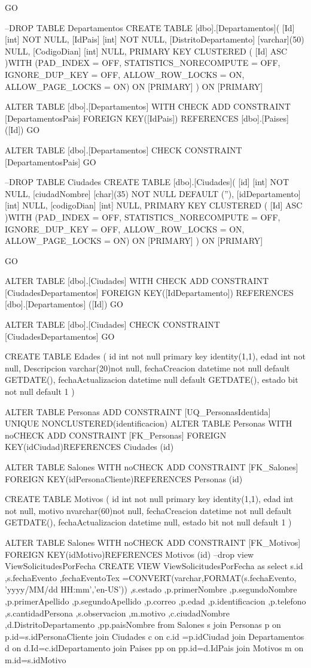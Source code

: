 GO

--DROP TABLE Departamentos
CREATE TABLE [dbo].[Departamentos](
	[Id] [int] NOT NULL,
	[IdPais] [int] NOT NULL,
	[DistritoDepartamento] [varchar](50) NULL,
	[CodigoDian] [int] NULL,
PRIMARY KEY CLUSTERED 
(
	[Id] ASC
)WITH (PAD_INDEX = OFF, STATISTICS_NORECOMPUTE = OFF, IGNORE_DUP_KEY = OFF, ALLOW_ROW_LOCKS = ON, ALLOW_PAGE_LOCKS = ON) ON [PRIMARY]
) ON [PRIMARY]


ALTER TABLE [dbo].[Departamentos]  WITH CHECK ADD  CONSTRAINT [DepartamentosPais] FOREIGN KEY([IdPais])
REFERENCES [dbo].[Paises] ([Id])
GO

ALTER TABLE [dbo].[Departamentos] CHECK CONSTRAINT [DepartamentosPais]
GO

--DROP TABLE Ciudades
CREATE TABLE [dbo].[Ciudades](
	[id] [int] NOT NULL,
	[ciudadNombre] [char](35) NOT NULL DEFAULT (''),
	[idDepartamento] [int] NULL,
	[codigoDian] [int] NULL,
PRIMARY KEY CLUSTERED 
(
	[Id] ASC
)WITH (PAD_INDEX = OFF, STATISTICS_NORECOMPUTE = OFF, IGNORE_DUP_KEY = OFF, ALLOW_ROW_LOCKS = ON, ALLOW_PAGE_LOCKS = ON) ON [PRIMARY]
) ON [PRIMARY]

GO

ALTER TABLE [dbo].[Ciudades]  WITH CHECK ADD  CONSTRAINT [CiudadesDepartamentos] FOREIGN KEY([IdDepartamento])
REFERENCES [dbo].[Departamentos] ([Id])
GO

ALTER TABLE [dbo].[Ciudades] CHECK CONSTRAINT [CiudadesDepartamentos]
GO

CREATE TABLE Edades
(
	id int not null primary key identity(1,1),
	edad int not null,
	Descripcion varchar(20)not null,
    fechaCreacion datetime not null default GETDATE(),
	fechaActualizacion datetime null default GETDATE(),
    estado bit not null default 1
)

ALTER TABLE Personas ADD  CONSTRAINT [UQ_PersonasIdentida] UNIQUE NONCLUSTERED(identificacion)
ALTER TABLE Personas  WITH noCHECK ADD  CONSTRAINT [FK_Personas] FOREIGN KEY(idCiudad)REFERENCES Ciudades (id)

ALTER TABLE Salones  WITH noCHECK ADD  CONSTRAINT [FK_Salones] FOREIGN KEY(idPersonaCliente)REFERENCES Personas (id)


CREATE TABLE Motivos
(
	id int not null primary key identity(1,1),
	edad int not null,
	motivo nvarchar(60)not null,
    fechaCreacion datetime not null default GETDATE(),
	fechaActualizacion datetime null,
    estado bit not null default 1
)


ALTER TABLE Salones  WITH noCHECK ADD  CONSTRAINT [FK_Motivos] FOREIGN KEY(idMotivo)REFERENCES Motivos (id)
--drop view ViewSolicitudesPorFecha
CREATE VIEW  ViewSolicitudesPorFecha as
select s.id
,s.fechaEvento
,fechaEventoTex =CONVERT(varchar,FORMAT(s.fechaEvento, 'yyyy/MM/dd HH:mm','en-US'))
,s.estado
,p.primerNombre
,p.segundoNombre
,p.primerApellido
,p.segundoApellido
,p.correo
,p.edad
,p.identificacion
,p.telefono
,s.cantidadPersona
,s.observacion
,m.motivo
,c.ciudadNombre
,d.DistritoDepartamento
,pp.paisNombre
from Salones s
join Personas p on p.id=s.idPersonaCliente
join Ciudades c on c.id =p.idCiudad
join Departamentos d on d.Id=c.idDepartamento
join Paises pp on pp.id=d.IdPais
join Motivos m on m.id=s.idMotivo


